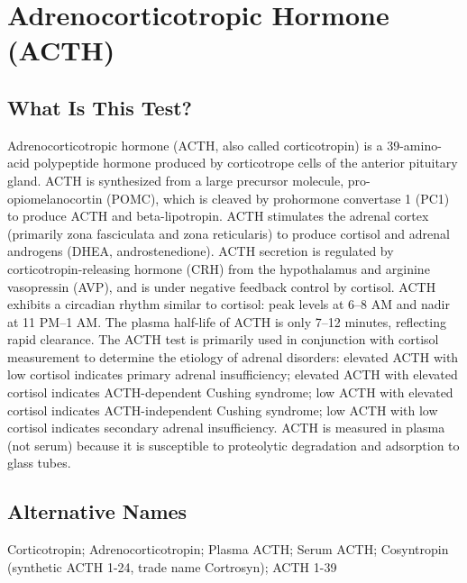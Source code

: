 \chapter{Adrenocorticotropic Hormone (ACTH)}

\section*{What Is This Test?}
Adrenocorticotropic hormone (ACTH, also called corticotropin) is a 39-amino-acid polypeptide hormone produced by corticotrope cells of the anterior pituitary gland. ACTH is synthesized from a large precursor molecule, pro-opiomelanocortin (POMC), which is cleaved by prohormone convertase 1 (PC1) to produce ACTH and beta-lipotropin. ACTH stimulates the adrenal cortex (primarily zona fasciculata and zona reticularis) to produce cortisol and adrenal androgens (DHEA, androstenedione). ACTH secretion is regulated by corticotropin-releasing hormone (CRH) from the hypothalamus and arginine vasopressin (AVP), and is under negative feedback control by cortisol. ACTH exhibits a circadian rhythm similar to cortisol: peak levels at 6--8 AM and nadir at 11 PM--1 AM. The plasma half-life of ACTH is only 7--12 minutes, reflecting rapid clearance. The ACTH test is primarily used in conjunction with cortisol measurement to determine the etiology of adrenal disorders: elevated ACTH with low cortisol indicates primary adrenal insufficiency; elevated ACTH with elevated cortisol indicates ACTH-dependent Cushing syndrome; low ACTH with elevated cortisol indicates ACTH-independent Cushing syndrome; low ACTH with low cortisol indicates secondary adrenal insufficiency. ACTH is measured in plasma (not serum) because it is susceptible to proteolytic degradation and adsorption to glass tubes.

\section*{Alternative Names}
Corticotropin; Adrenocorticotropin; Plasma ACTH; Serum ACTH; Cosyntropin (synthetic ACTH 1-24, trade name Cortrosyn); ACTH 1-39

